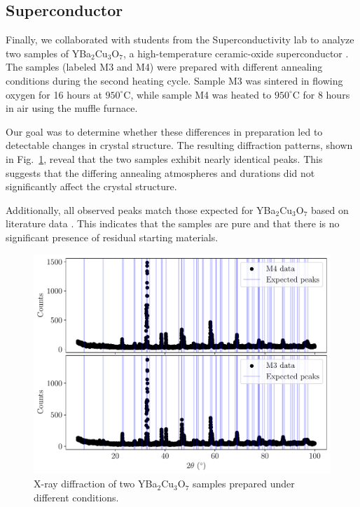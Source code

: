 \documentclass{../paper}
\newcommand{\fig}[1]{Fig.~#1}
\begin{document}
\subsection{Superconductor}

Finally, we collaborated with students from the Superconductivity lab to analyze two samples of YBa$_2$Cu$_3$O$_7$, a high-temperature ceramic-oxide superconductor \cite{Superconductivity}. The samples (labeled M3 and M4) were prepared with different annealing conditions during the second heating cycle. Sample M3 was sintered in flowing oxygen for 16 hours at $950^\circ$C, while sample M4 was heated to $950^\circ$C for 8 hours in air using the muffle furnace.

Our goal was to determine whether these differences in preparation led to detectable changes in crystal structure. The resulting diffraction patterns, shown in \fig{\ref{fig:peaks-super}}, reveal that the two samples exhibit nearly identical peaks. This suggests that the differing annealing atmospheres and durations did not significantly affect the crystal structure.

Additionally, all observed peaks match those expected for YBa$_2$Cu$_3$O$_7$ based on literature data \cite{YBa2Cu3O7}. This indicates that the samples are pure and that there is no significant presence of residual starting materials.

\begin{figure}
  \centering
  \includegraphics[width=\columnwidth]{analysis/peaks-YBa2Cu3O7.pdf}
  \caption{X-ray diffraction of two YBa$_2$Cu$_3$O$_7$ samples prepared under different conditions.}
  \label{fig:peaks-super}
\end{figure}
\end{document}
